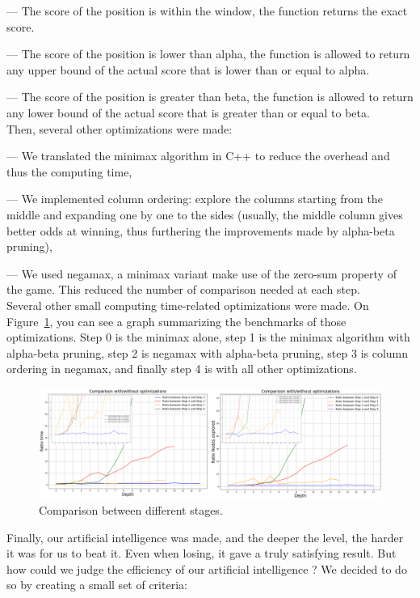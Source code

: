 \documentclass[11pt, a4paper, oneside]{report}
\begin{document}
	— The score of the position is within the window, the function returns the exact score.
	
	— The score of the position is lower than alpha, the function is allowed to return any upper bound of the actual score that is lower than or equal to alpha.

	— The score of the position is greater than beta, the function is allowed to return any lower bound of the actual score that is greater than or equal to beta. \\
	Then, several other optimizations were made:
	
	— We translated the minimax algorithm in C++ to reduce the overhead and thus the computing time,

	— We implemented column ordering: explore the columns starting from the middle and expanding one by one to the sides (usually, the middle column gives better odds at winning, thus furthering the improvements made by alpha-beta pruning),

	— We used negamax, a minimax variant make use of the zero-sum property of the game. This reduced the number of comparison needed at each step. \\

	Several other small computing time-related optimizations were made. On Figure~\ref{fig:ai_benchmarks}, you can see a graph summarizing the benchmarks of those optimizations. Step 0 is the minimax alone, step 1 is the minimax algorithm with alpha-beta pruning, step 2 is negamax with alpha-beta pruning, step 3 is column ordering in negamax, and finally step 4 is with all other optimizations. \\

	\begin{figure}[ht]
		\includegraphics[scale=0.7]{Comparison_ai_stages.png}
		\centering
		\caption{Comparison between different stages.}\label{fig:ai_benchmarks}
	\end{figure}
	Finally, our artificial intelligence was made, and the deeper the level, the harder it was for us to beat it. Even when losing, it gave a truly satisfying result. But how could we judge the efficiency of our artificial intelligence ? We decided to do so by creating a small set of criteria:
\end{document}
